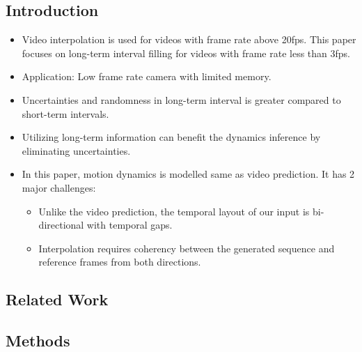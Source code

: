 \documentclass{article}
\begin{document}
    \subsection{Introduction}\label{subsec:Stochastic_Dynamics_for_Video_Infilling_(SDVI):introduction}
    \begin{itemize}
        \item Video interpolation is used for videos with frame rate above 20fps.
        This paper focuses on long-term interval filling for videos with frame rate less than 3fps.
        \item Application: Low frame rate camera with limited memory.
        \item Uncertainties and randomness in long-term interval is greater compared to short-term intervals.
        \item Utilizing long-term information can benefit the dynamics inference by eliminating uncertainties.
        \item In this paper, motion dynamics is modelled same as video prediction.
        It has 2 major challenges:
        \begin{itemize}
            \item Unlike the video prediction, the temporal layout of our input is bi-directional with temporal gaps.
            \item Interpolation requires coherency between the generated sequence and reference frames from both directions.
        \end{itemize}
    \end{itemize}

    \subsection{Related Work}\label{subsec:Stochastic_Dynamics_for_Video_Infilling_(SDVI):related-work}

    \subsection{Methods}\label{subsec:Stochastic_Dynamics_for_Video_Infilling_(SDVI):methods}
\end{document}
